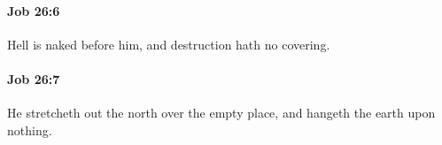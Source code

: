 		\paragraph{Job 26:6} %
			\label{JOB-26-6}

			Hell is naked before him, and destruction hath no covering.


		\paragraph{Job 26:7} %
			\label{JOB-26-7}

			He stretcheth out the north over the empty place, and hangeth the earth upon nothing.



